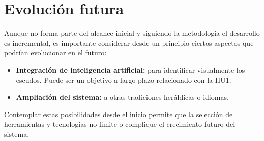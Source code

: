 \section{Evolución futura}
Aunque no forma parte del alcance inicial y siguiendo la metodología el desarrollo es incremental, 
es importante considerar desde un principio ciertos aspectos que podrían evolucionar en el futuro:

\begin{itemize}
    \item \textbf{Integración de inteligencia artificial: } para identificar visualmente los escudos.
    Puede ser un objetivo a largo plazo relacionado con la HU1.
    \item \textbf{Ampliación del sistema: } a otras tradiciones heráldicas o idiomas.
\end{itemize}

Contemplar estas posibilidades desde el inicio permite que la selección de herramientas y tecnologías
no limite o complique el crecimiento futuro del sistema.